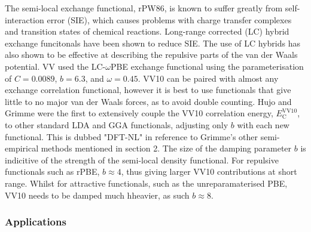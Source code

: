 \documentclass[10pt,a4paper,twocolumn,twoside]{extarticle}
\begin{document}
	The semi-local exchange functional, rPW86, is known to suffer greatly from self-interaction error (SIE), which causes problems with charge transfer complexes and transition states of chemical reactions. Long-range corrected (LC) hybrid exchange funcitonals have been shown to reduce SIE. \cite{vydrov2006-LC-Hybrids} The use of LC hybrids has also shown to be effective at describing the repulsive parts of the van der Waals potential. \cite{sato2007-LC-Hybrids} VV used the LC-$\omega$PBE exchange functional using the parameterisation of $C = 0.0089$, $b = 6.3$, and $\omega = 0.45$.
	VV10 can be paired with almost any exchange correlation functional, however it is best to use functionals that give little to no major van der Waals forces, as to avoid double counting.
	Hujo and Grimme were the first to extensively couple the VV10 correlation energy, $E_\text{C}^\text{VV10}$, to other standard LDA and GGA functionals, adjusting only $b$ with each new functional.\cite{Grimme2011-VV10-LDA-GGA-Pairing} This is dubbed "DFT-NL" in reference to Grimme's other semi-empirical methods mentioned in section 2. The size of the damping parameter $b$ is indicitive of the strength of the semi-local density functional. For repulsive functionals such as rPBE, $b \approx 4$, thus giving larger VV10 contributions at short range. Whilst for attractive functionals, such as the unreparamaterised PBE, VV10 needs to be damped much hheavier, as such $b \approx 8$.\cite{Grimme2011}
	
	\subsubsection{Applications}


	
	\newpage
	\printbibliography
\end{document}
